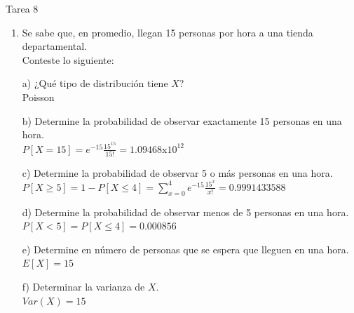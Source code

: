 \documentclass[a4paper, 12pt]{article}
\newcommand{\Aspace}{0.2cm}
\begin{document}
    \newpage
    \begin{center}
        { \LARGE Tarea 8}
    \end{center}

    \begin{enumerate}
        \item Se sabe que, en promedio, llegan 15 personas por hora a una tienda departamental.
            \\ Conteste lo siguiente:
            \vspace{\Aspace} \par
            a) ¿Qué tipo de distribución tiene $X$?
            \\ { \color{azul} Poisson }

            \vspace{\Aspace} \par
            b) Determine la probabilidad de observar exactamente 15 personas en una hora.
            \\ { \color{azul} $P[X = 15] = e^{-15} \frac{15^{15}}{15!} = 1{.}09468$x$10^{12}$ }

            \vspace{\Aspace} \par
            c) Determine la probabilidad de observar 5 o más personas en una hora.
            \\ { \color{azul} $P[X \geq 5] = 1 - P[X \leq 4] = \sum\limits_{x = 0}^{4} e^{-15} \frac{15^{x}}{x!} = 0{.}9991433588$ }

            \vspace{\Aspace} \par
            d) Determine la probabilidad de observar menos de 5 personas en una hora.
            \\ { \color{azul} $P[X < 5] = P[X \leq 4] = 0{.}000856$ }

            \vspace{\Aspace} \par
            e) Determine en número de personas que se espera que lleguen en una hora.
            \\ { \color{azul} $E[X] = 15$ }

            \vspace{\Aspace} \par
            f) Determinar la varianza de $X$.
            \\ { \color{azul} $Var(X) = 15$ }



\end{enumerate}
\end{document}
